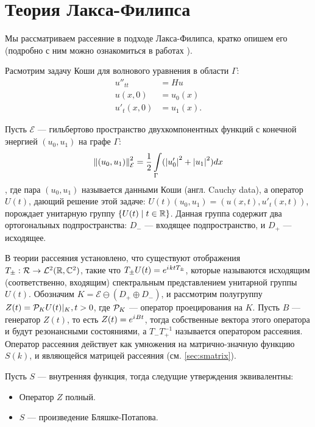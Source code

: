 \section{Теория Лакса-Филипса}
Мы рассматриваем рассеяние в подходе Лакса-Филипса, кратко опишем его (подробно с ним можно ознакомиться в работах \cite{lax1990scattering,lax1976scattering}).

Расмотрим задачу Коши для волнового уравнения в области $\Gamma$:
\begin{equation}
\begin{aligned}
   u''_{tt}   &= H u
\\ u(x, 0)    &= u_0(x)
\\ u'_t(x, 0) &= u_1(x).
\end{aligned}
\end{equation}

Пусть $\mathcal{E}$ — гильбертово пространство двухкомпонентных функций с конечной энергией $(u_0, u_1)$ на графе $\Gamma$:
\[
\norm{(u_0, u_1)}^2_{\mathcal{E}} = \frac{1}{2} \int\limits_\Gamma (\abs{u'_0}^2 + \abs{u_1}^2) dx
\]
, где пара $(u_0, u_1)$ называется данными Коши (англ. Cauchy data), а оператор $U(t)$, дающий решение этой задаче: $U(t)(u_0, u_1) = (u(x, t), u'_t(x, t))$, порождает унитарную группу $\{ U(t) \mid t \in \mathbb{R} \}$. Данная группа содержит два ортогональных подпространства: $D_-$ — входящее подпространство, и $D_+$ — исходящее.

В теории рассеяния установлено, что существуют отображения $T_\pm: \mathcal{R} \to \mathcal{L}^2(\mathbb{R}, \mathbb{C}^2)$, такие что $T_\pm U(t) = e^{{i\mkern1mu} k t T_\pm}$, которые называются исходящим (соответственно, входящим) спектральным представлением унитарной группы $U(t)$. Обозначим $K = \mathcal{E} \ominus (D_+ \oplus D_-)$, и рассмотрим полугруппу $Z(t) = \mathcal{P}_K U(t)|_K, t > 0$, где $\mathcal{P}_K$ — оператор проецирования на $K$. Пусть $B$ — генератор $Z(t)$, то есть $Z(t) = e^{{i\mkern1mu} B t}$, тогда собственные вектора этого оператора и будут резонансными состояниями, а $T_- T_+^{-1}$ называется оператором рассеяния. Оператор рассеяния действует как умножения на матрично-значную функцию $S(k)$, и являющейся матрицей рассеяния (см. \autoref{sec:smatrix}).

\begin{theorem}
Пусть $S$ — внутренняя функция, тогда следущие утверждения эквивалентны:
\begin{itemize}
\item Оператор $Z$ полный.
\item $S$ — произведение Бляшке-Потапова.
\end{itemize}
\end{theorem}

